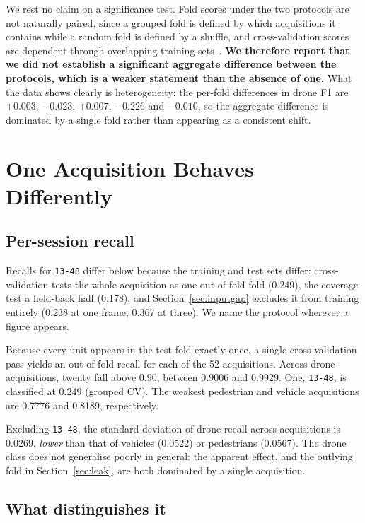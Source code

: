 \documentclass[conference]{IEEEtran}
\begin{document}
We rest no claim on a significance test. Fold scores under the two protocols are not naturally paired, since a grouped fold is defined by which acquisitions it contains while a random fold is defined by a shuffle, and cross-validation scores are dependent through overlapping training sets~\cite{dietterich1998,nadeau2003}. \textbf{We therefore report that we did not establish a significant aggregate difference between the protocols, which is a weaker statement than the absence of one.} What the data shows clearly is heterogeneity: the per-fold differences in drone F1 are $+0.003$, $-0.023$, $+0.007$, $-0.226$ and $-0.010$, so the aggregate difference is dominated by a single fold rather than appearing as a consistent shift.

\section{One Acquisition Behaves Differently}
\label{sec:regime}

\subsection{Per-session recall}

Recalls for \texttt{13-48} differ below because the training and test sets differ: cross-validation tests the whole acquisition as one out-of-fold fold (0.249), the coverage test a held-back half (0.178), and Section~\ref{sec:inputgap} excludes it from training entirely (0.238 at one frame, 0.367 at three). We name the protocol wherever a figure appears.


Because every unit appears in the test fold exactly once, a single cross-validation pass yields an out-of-fold recall for each of the 52 acquisitions. Across drone acquisitions, twenty fall above 0.90, between 0.9006 and 0.9929. One, \texttt{13-48}, is classified at 0.249 (grouped CV). The weakest pedestrian and vehicle acquisitions are 0.7776 and 0.8189, respectively.

Excluding \texttt{13-48}, the standard deviation of drone recall across acquisitions is 0.0269, \emph{lower} than that of vehicles (0.0522) or pedestrians (0.0567). The drone class does not generalise poorly in general: the apparent effect, and the outlying fold in Section~\ref{sec:leak}, are both dominated by a single acquisition.

\subsection{What distinguishes it}
\end{document}
